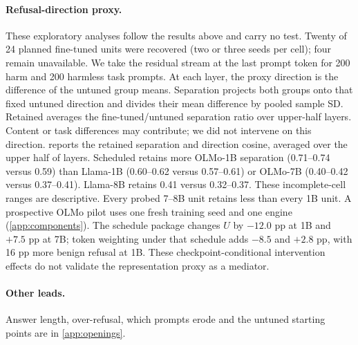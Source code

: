 \documentclass[11pt]{article}
\begin{document}
\paragraph{Refusal-direction proxy.} These exploratory analyses follow the
results above and carry no test. Twenty of 24 planned fine-tuned units were
recovered (two or three seeds per cell); four remain unavailable. We take
the residual stream at the last prompt token for 200 harm and 200 harmless
task prompts. At each layer, the proxy direction is the difference of the
untuned group means. Separation projects both groups onto that fixed untuned
direction and divides their mean difference by pooled sample SD. Retained
averages the fine-tuned/untuned separation ratio over upper-half layers.
Content or task differences may contribute; we did not intervene on this direction.  reports the retained
separation and direction cosine, averaged over the upper half of layers.
Scheduled retains more OLMo-1B separation (0.71--0.74 versus 0.59) than
Llama-1B (0.60--0.62 versus 0.57--0.61) or OLMo-7B (0.40--0.42 versus
0.37--0.41). Llama-8B retains 0.41 versus 0.32--0.37. These incomplete-cell
ranges are descriptive. Every probed 7--8B unit retains less than every 1B unit.
A prospective OLMo pilot uses one fresh training seed and one engine
(\cref{app:components}). The schedule package changes $U$ by $-12.0$ pp at
1B and $+7.5$ pp at 7B; token weighting under that schedule adds $-8.5$ and
$+2.8$ pp, with 16 pp more benign refusal at 1B. These checkpoint-conditional
intervention effects do not validate the representation proxy as a mediator.


\paragraph{Other leads.} Answer length, over-refusal, which prompts erode and the untuned starting points are in \cref{app:openings}.

\end{document}

